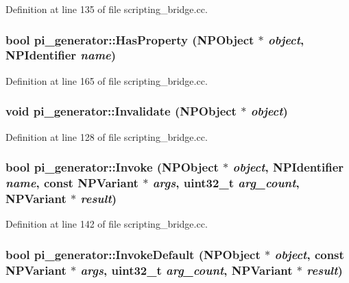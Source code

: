 Definition at line 135 of file scripting\_\-bridge.cc.

\hypertarget{namespacepi__generator_a87a1eff2d42a1e673e616057680369b7}{
\subsubsection[{HasProperty}]{\setlength{\rightskip}{0pt plus 5cm}bool pi\_\-generator::HasProperty ({\bf NPObject} $\ast$ {\em object}, \/  {\bf NPIdentifier} {\em name})}}
\label{namespacepi__generator_a87a1eff2d42a1e673e616057680369b7}


Definition at line 165 of file scripting\_\-bridge.cc.

\hypertarget{namespacepi__generator_a733df66e71ec7f2dba460c638180aa0e}{
\subsubsection[{Invalidate}]{\setlength{\rightskip}{0pt plus 5cm}void pi\_\-generator::Invalidate ({\bf NPObject} $\ast$ {\em object})}}
\label{namespacepi__generator_a733df66e71ec7f2dba460c638180aa0e}


Definition at line 128 of file scripting\_\-bridge.cc.

\hypertarget{namespacepi__generator_a861f69824d0671573232af470d07c0fa}{
\subsubsection[{Invoke}]{\setlength{\rightskip}{0pt plus 5cm}bool pi\_\-generator::Invoke ({\bf NPObject} $\ast$ {\em object}, \/  {\bf NPIdentifier} {\em name}, \/  const {\bf NPVariant} $\ast$ {\em args}, \/  uint32\_\-t {\em arg\_\-count}, \/  {\bf NPVariant} $\ast$ {\em result})}}
\label{namespacepi__generator_a861f69824d0671573232af470d07c0fa}


Definition at line 142 of file scripting\_\-bridge.cc.

\hypertarget{namespacepi__generator_a7fab356f3ceba853332861bcc927c54f}{
\subsubsection[{InvokeDefault}]{\setlength{\rightskip}{0pt plus 5cm}bool pi\_\-generator::InvokeDefault ({\bf NPObject} $\ast$ {\em object}, \/  const {\bf NPVariant} $\ast$ {\em args}, \/  uint32\_\-t {\em arg\_\-count}, \/  {\bf NPVariant} $\ast$ {\em result})}}
\label{namespacepi__generator_a7fab356f3ceba853332861bcc927c54f}


